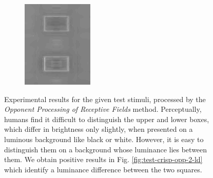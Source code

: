 \documentclass[journal,onecolumn]{IEEEtran}
\begin{document}
{\begin{figure}[H]
\begin{subfigure}[b]{0.2\textwidth}
            \caption{}
            \label{fig:test-crisp-opp-2-by}
    \end{subfigure}%
    \begin{subfigure}[b]{0.2\textwidth}
            \centering
            \includegraphics[width=.85\linewidth, frame]{test-crisp-opp-3-by}
            \caption{}
            \label{fig:test-crisp-opp-3-by}
    \end{subfigure}
    \caption{Experimental results for the given test stimuli, processed by the \textit{Opponent Processing of Receptive Fields} method. Perceptually, humans find it difficult to distinguish the upper and lower boxes, which differ in brightness only slightly, when presented on a luminous background like black or white. However, it is easy to distinguish them on a background whose luminance lies between them. We obtain positive results in Fig. \ref{fig:test-crisp-opp-2-ld} which identify a luminance difference between the two squares.}
\end{figure}
\clearpage
}
\end{document}

